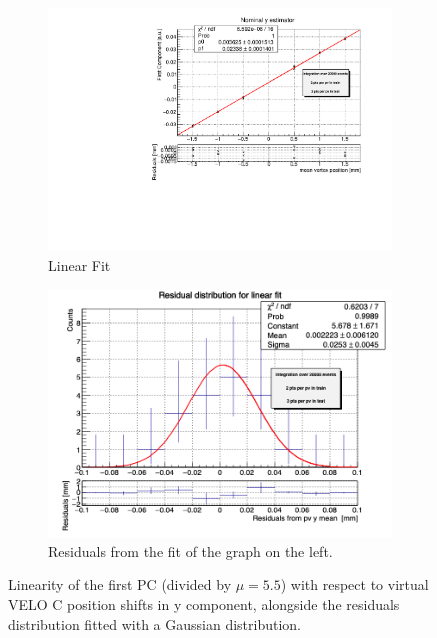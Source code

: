 \begin{figure}
    \centering
    \begin{subfigure}{0.48\textwidth}
    \includegraphics[width=\linewidth]{figures/y_fit_veloC_MC_normalised.pdf}
    \caption{Linear Fit}\label{fig:y_veloC_fit_MC}
    \end{subfigure}
    \begin{subfigure}{0.48\textwidth}
    \includegraphics[width=\linewidth]{figures/y_res_veloC_MC.png}
    \caption{Residuals from the fit of the graph on the left. }\label{fig:y_veloC_res_MC}
    \end{subfigure}
    \caption{Linearity of the first PC (divided by $\mu=5.5$) with respect to  virtual VELO C position shifts in y component, alongside the residuals distribution fitted with a Gaussian distribution.}
    \label{fig:y_veloC_MC}
\end{figure}

